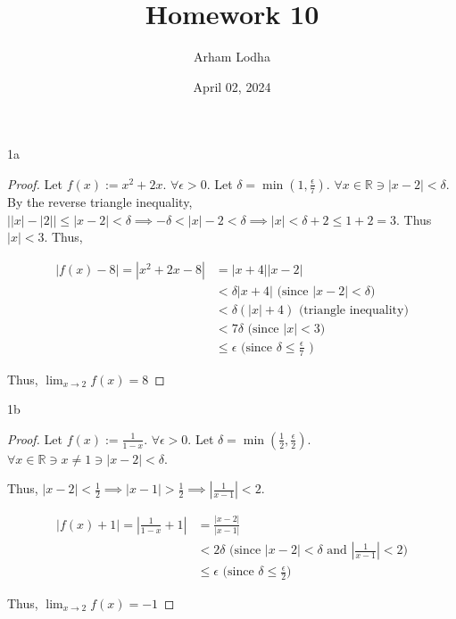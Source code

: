 \documentclass{article}
\newcommand{\R}{\mathbb{R}}
\newcommand{\abs}[1]{\left\lvert #1\right\rvert}
\begin{document}
\title{Homework 10}
\author{Arham Lodha}%
\date{April 02, 2024}%
\maketitle

\begin{PROB}{1a}\label{Problem 1a.}
\end{PROB}
\begin{proof}
    Let $f(x) := x^2 + 2x$. $\forall \epsilon > 0$. Let $\delta = \min(1, \frac{\epsilon}{7})$. $\forall x \in \R \ni \abs{x - 2} < \delta$. 
    By the reverse triangle inequality, $\abs{\abs{x} - \abs{2}} \leq \abs{x - 2} < \delta \implies -\delta < \abs{x} - 2 < \delta \implies \abs{x} < \delta + 2 \leq 1 + 2 = 3$. Thus $\abs{x} < 3$. 
    Thus, 
    
    \begin{align*}
        \abs{f(x) - 8} = \abs{x^2 + 2x - 8} &= \abs{x + 4}\abs{x - 2}\\
        &< \delta \abs{x + 4} \text{ (since $\abs{x - 2} < \delta$)} \\
        &< \delta (\abs{x} + 4) \text{ (triangle inequality)} \\
        &< 7\delta \text{ (since $\abs{x} < 3$)} \\
        &\leq \epsilon \text{ (since $\delta \leq \frac{\epsilon}{7}$ )}
    \end{align*}
    
    Thus, $\lim_{x \to 2} f(x) = 8$ 
\end{proof}

\begin{PROB}{1b}\label{Problem 1b.}
\end{PROB}
\begin{proof}
    Let $f(x) := \frac{1}{1 - x}$. $\forall \epsilon > 0$. Let $\delta = \min(\frac{1}{2}, \frac{\epsilon}{2})$. $\forall x \in \R \ni x \neq 1 \ni \abs{x - 2} < \delta$.  
    
    Thus, $\abs{x - 2} < \frac{1}{2} \implies \abs{x - 1} > \frac{1}{2} \implies \abs{\frac{1}{x - 1}} < 2$.  
    
    \begin{align*}
        \abs{f(x) + 1} = \abs{\frac{1}{1 - x} + 1} &= \frac{\abs{x - 2}}{\abs{x - 1}}\\
        &< 2\delta \text{ (since $\abs{x - 2} < \delta$ and $\abs{\frac{1}{x - 1}} < 2$)} \\
        &\leq \epsilon \text{ (since $\delta \leq \frac{\epsilon}{2}$)}
    \end{align*}
    
    Thus, $\lim_{x \to 2} f(x) = -1$
\end{proof}
\end{document}
